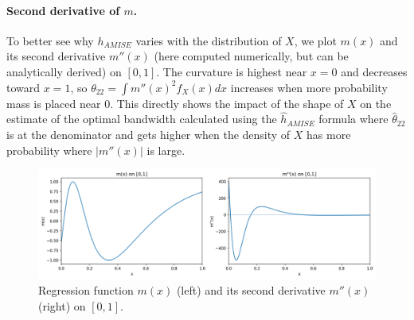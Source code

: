 \documentclass[11pt]{article}
\begin{document}
\paragraph{Second derivative of \(m\).}
To better see why \(h_{AMISE}\) varies with the distribution of \(X\), we plot \(m(x)\) and its second derivative \(m''(x)\) (here computed numerically, but can be analytically derived) on \([0,1]\).
The curvature is highest near \(x=0\) and decreases toward \(x=1\), so \(\theta_{22}=\int m''(x)^2 f_X(x)dx\) increases when more probability mass is placed near \(0\).
This directly shows the impact of the shape of \(X\) on the estimate of the optimal bandwidth calculated using the \(\hat h_{AMISE}\) formula where \(\hat \theta_{22}\) is at the denominator and gets higher when the density of \(X\) has more probability where \(|m''(x)|\) is large.
\begin{figure}[h]
\centering
\includegraphics[width=.9\linewidth]{output/m_and_mpp.png}
\caption{Regression function \(m(x)\) (left) and its second derivative \(m''(x)\) (right) on \([0,1]\).}
\label{fig:m_mpp}
\end{figure}
\FloatBarrier
\end{document}
